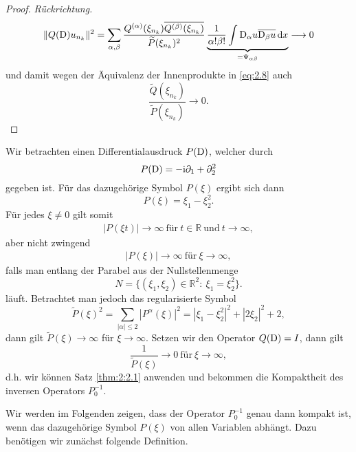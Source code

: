 \begin{proof} {\it Rückrichtung.}
\begin{equation}
\lVert Q(\mathrm D)u_{n_k}\rVert^2=\sum_{\alpha,\beta}\frac{Q^{(\alpha)}(\xi_{n_k}) \overline{Q^{(\beta)}(\xi_{n_k})}}{\widetilde{P}(\xi_{n_k})^2} \underbrace{\frac{1}{\alpha! \beta!}\int \mathrm D_\alpha u \overline{\mathrm D_\beta u} \,\mathrm d x}_{=\Psi_{\alpha \beta}} \longrightarrow 0
\end{equation}
und damit wegen der Äquivalenz der Innenprodukte in \eqref{eq:2.8} auch 
\begin{equation}
\frac{\widetilde{Q}(\xi_{n_k})}{\widetilde{P}(\xi_{n_k})} \longrightarrow 0.
\end{equation}
\end{proof}
\begin{exa}
Wir betrachten einen Differentialausdruck $P(\mathrm D)$, welcher durch
\begin{equation}
P(\mathrm D) = -\mathrm i\partial_1 + \partial_2^2
\end{equation}
gegeben ist. Für das dazugehörige Symbol $P(\xi)$ ergibt sich dann
\begin{equation}
P(\xi) = \xi_1 - \xi_2^2.
\end{equation}
Für jedes $\xi \not = 0$ gilt somit
\begin{align}
|P(\xi t)| \rightarrow \infty \ \text{für} \ t\in \mathbb{R} \ \text{und} \ t \rightarrow \infty,
\end{align}
aber nicht zwingend
\begin{align}
|P(\xi)| \rightarrow \infty \ \text{für} \ \xi \rightarrow \infty,
\end{align}
falls man entlang der Parabel aus der Nullstellenmenge\begin{equation}
N= \{ (\xi_1,\xi_2)\in \mathbb{R}^2 : \ \xi_1 = \xi_2^2 \}.
\end{equation}
läuft. Betrachtet man jedoch das regularisierte Symbol
\begin{equation}
\widetilde{P}(\xi)^2 = \sum_{|\alpha| \leq 2} |P^{\alpha}(\xi)|^2 = |\xi_1 - \xi_2^2|^2 + |2\xi_2|^2 + 2,
\end{equation}
dann gilt $\widetilde{P}(\xi) \rightarrow \infty$ für $\xi \rightarrow \infty$. Setzen wir den Operator $Q(\mathrm D)=I$, dann gilt
\begin{equation}
\frac{1}{\widetilde{P}(\xi)} \rightarrow 0 \ \text{für} \ \xi \rightarrow \infty,
\end{equation}
d.h. wir können Satz \ref{thm:2:2.1} anwenden und bekommen die Kompaktheit des inversen Operators $P_0^{-1}$.
\end{exa}
Wir werden im Folgenden zeigen, dass der Operator $P_0^{-1}$ genau dann kompakt ist, wenn das dazugehörige Symbol $P(\xi)$ von allen Variablen abhängt. Dazu benötigen wir zunächst folgende Definition.
